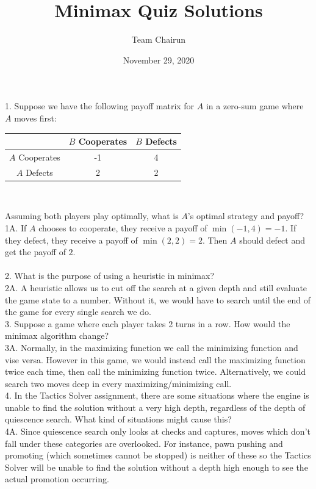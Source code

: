\documentclass[12pt, letterpaper]{article}
\title{Minimax Quiz Solutions}
\author{Team Chairun}
\date{November 29, 2020}
\begin{document}
\maketitle

1. Suppose we have the following payoff matrix for $A$ in a zero-sum game where $A$ moves first: \\
\begin{table}[H]
\centering
\begin{tabular}{|c|c|c|}
    \hline
    & $B$ Cooperates & $B$ Defects \\
    \hline
    $A$ Cooperates & -1 & 4 \\
    \hline
    $A$ Defects & 2 & 2 \\
    \hline
\end{tabular} \\
\end{table}
Assuming both players play optimally, what is $A$'s optimal strategy and payoff? \\
1A. If $A$ chooses to cooperate, they receive a payoff of $\min(-1, 4) = -1$. If they defect, they receive a payoff of $\min(2, 2) = 2$. Then $A$ should defect and get the payoff of $2$. \\\\
2. What is the purpose of using a heuristic in minimax? \\
2A. A heuristic allows us to cut off the search at a given depth and still evaluate the game state to a number. Without it, we would have to search until the end of the game for every single search we do. \\

3. Suppose a game where each player takes 2 turns in a row. How would the minimax algorithm change? \\
3A. Normally, in the maximizing function we call the minimizing function and vise versa. However in this game, we would instead call the maximizing function twice each time, then call the minimizing function twice. Alternatively, we could search two moves deep in every maximizing/minimizing call. \\

4. In the Tactics Solver assignment, there are some situations where the engine is unable to find the solution without a very high depth, regardless of the depth of quiescence search. What kind of situations might cause this? \\
4A. Since quiescence search only looks at checks and captures, moves which don't fall under these categories are overlooked. For instance, pawn pushing and promoting (which sometimes cannot be stopped) is neither of these so the Tactics Solver will be unable to find the solution without a depth high enough to see the actual promotion occurring. \\
\end{document}
